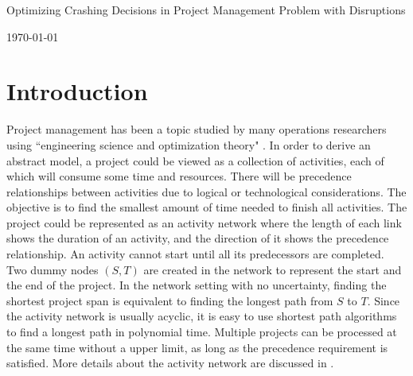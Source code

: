 \documentclass[11pt]{article}
\newcommand{\ms}{\medskip}
\begin{document}
\baselineskip0.25in

\begin{center}
\begin{large}
\begin{bf}

Optimizing Crashing Decisions in Project Management Problem with Disruptions \ms

\today \ms
\end{bf}
\end{large}
\end{center}

\section{Introduction} \label{sec:introduction}
	Project management has been a topic studied by many operations researchers using ``engineering science and optimization theory" \cite{soderlund2004building}. In order to derive an abstract model, a project could be viewed as a collection of activities, each of which will consume some time and resources. There will be precedence relationships between activities due to logical or technological considerations. The objective is to find the smallest amount of time needed to finish all activities. The project could be represented as an activity network where the length of each link shows the duration of an activity, and the direction of it shows the precedence relationship. An activity cannot start until all its predecessors are completed. Two dummy nodes \((S,T)\) are created in the network to represent the start and the end of the project. In the network setting with no uncertainty, finding the shortest project span is equivalent to finding the longest path from \(S\) to \(T\). Since the activity network is usually acyclic, it is easy to use shortest path algorithms to find a longest path in polynomial time. Multiple projects can be processed at the same time without a upper limit, as long as the precedence requirement is satisfied. More details about the activity network are discussed in \cite{Elmaghraby77}.\\
	\newline 
\end{document}
